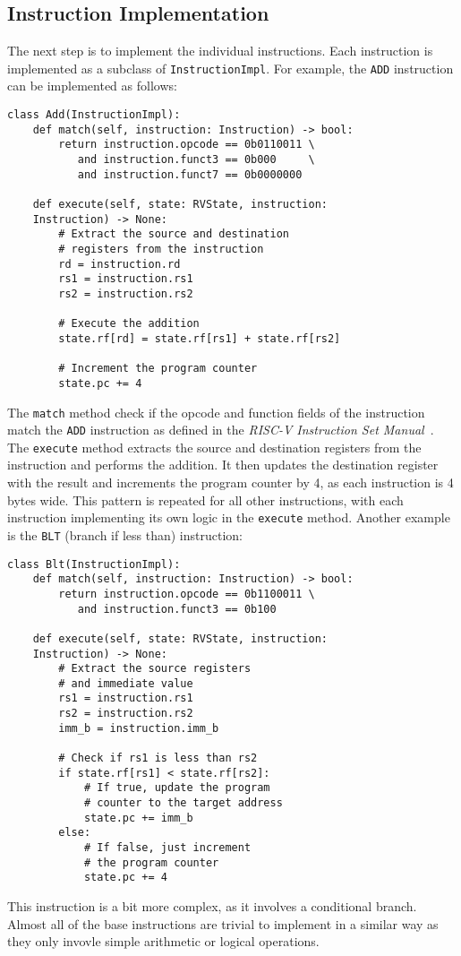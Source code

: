 \documentclass[sigconf]{acmart}
\begin{document}
\subsection{Instruction Implementation}
The next step is to implement the individual instructions. Each instruction is implemented as a subclass of \texttt{InstructionImpl}.
For example, the \texttt{ADD} instruction can be implemented as follows:
\begin{verbatim}
class Add(InstructionImpl):
    def match(self, instruction: Instruction) -> bool:
        return instruction.opcode == 0b0110011 \
           and instruction.funct3 == 0b000     \
           and instruction.funct7 == 0b0000000
    
    def execute(self, state: RVState, instruction: 
    Instruction) -> None:
        # Extract the source and destination 
        # registers from the instruction
        rd = instruction.rd
        rs1 = instruction.rs1
        rs2 = instruction.rs2

        # Execute the addition
        state.rf[rd] = state.rf[rs1] + state.rf[rs2]

        # Increment the program counter
        state.pc += 4
\end{verbatim}
The \texttt{match} method check if the opcode and function fields of the instruction match the \texttt{ADD} instruction as defined in the \textit{RISC-V Instruction Set Manual}~\cite{riscv-spec}.
The \texttt{execute} method extracts the source and destination registers from the instruction and performs the addition. It then updates the destination register with the result and increments the program counter by 4, as each instruction is 4 bytes wide.
This pattern is repeated for all other instructions, with each instruction implementing its own logic in the \texttt{execute} method.
Another example is the \texttt{BLT} (branch if less than) instruction:
\begin{verbatim}
class Blt(InstructionImpl):
    def match(self, instruction: Instruction) -> bool:
        return instruction.opcode == 0b1100011 \
           and instruction.funct3 == 0b100
    
    def execute(self, state: RVState, instruction: 
    Instruction) -> None:
        # Extract the source registers
        # and immediate value
        rs1 = instruction.rs1
        rs2 = instruction.rs2
        imm_b = instruction.imm_b

        # Check if rs1 is less than rs2
        if state.rf[rs1] < state.rf[rs2]:
            # If true, update the program 
            # counter to the target address
            state.pc += imm_b
        else:
            # If false, just increment 
            # the program counter
            state.pc += 4
\end{verbatim}
This instruction is a bit more complex, as it involves a conditional branch. 
Almost all of the base instructions are trivial to implement in a similar way as they only invovle simple arithmetic or logical operations.
\end{document}
